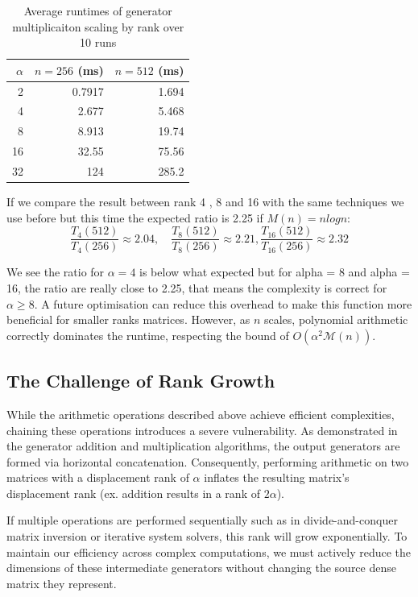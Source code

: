 \begin{table}[htpb]
  \centering
  \begin{tabular}{r r r}
    \hline
    $\alpha$ & $n=256$ (ms) & $n=512$ (ms) \\
    \hline
    2        & 0.7917        & 1.694         \\
    4        & 2.677        & 5.468          \\
    8        & 8.913        & 19.74          \\
    16        & 32.55        & 75.56         \\
    32       & 124        & 285.2            \\
    \hline
  \end{tabular}
  \caption{Average runtimes of generator multiplicaiton scaling by rank over 10 runs}
  \label{tab:bench_mul_rank}
\end{table}


If we compare the result between rank 4 , 8 and 16 with the same techniques we use before but this time the expected ratio is 2.25 if $M(n) =nlogn$:
$$ \frac{T_4(512)}{T_4(256)} \approx 2.04, \quad \frac{T_8(512)}{T_8(256)}
\approx 2.21,\frac{T_{16}(512)}{T_{16}(256)} \approx 2.32 $$ 

We see the ratio for $\alpha = 4$ is below what expected but for alpha = 8 and alpha = 16, the ratio are really close to 2.25, that means the complexity is correct for $\alpha \geq 8$. 
A future optimisation can reduce this overhead
to make this function more beneficial for smaller ranks matrices.
However, as $n$ scales,
polynomial arithmetic correctly dominates the runtime, respecting the bound of
$O(\alpha^2 \mathcal{M}(n))$.

\subsection{The Challenge of Rank Growth}

While the arithmetic operations described above achieve
efficient complexities, chaining these
operations introduces a severe vulnerability. As
demonstrated in the generator addition and multiplication algorithms,
the output generators are formed via horizontal concatenation.
Consequently, performing arithmetic on two matrices with a
displacement rank of $\alpha$ inflates the resulting
matrix's displacement rank (ex. addition results in a rank of $2\alpha$).

If multiple operations are performed sequentially such as in
divide-and-conquer matrix inversion or iterative system solvers, this
rank will grow exponentially. To maintain our
efficiency across complex computations, we must actively reduce the
dimensions of these intermediate generators without changing the
source dense matrix they represent.

